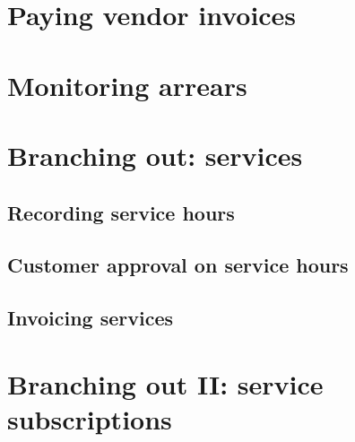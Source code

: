 



\chapter{Paying vendor invoices}
\label{cha:vendor-payments}




\chapter{Monitoring arrears}
\label{cha:monitoring-arrears}


\chapter{Branching out: services}



\section{Recording service hours}

\section{Customer approval on service hours}

\section{Invoicing services}

\chapter{Branching out II: service subscriptions}


